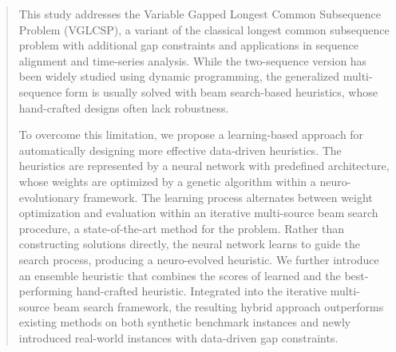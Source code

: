 \documentclass[runningheads]{llncs}
\begin{document}
\begin{abstract}
	

This study addresses the Variable Gapped Longest Common Subsequence Problem (VGLCSP), a variant of the classical longest common subsequence problem with additional gap constraints and applications in sequence alignment and time-series analysis. While the two-sequence version has been widely studied using dynamic programming, the generalized multi-sequence form is usually solved with beam search-based heuristics, whose hand-crafted designs often lack robustness.

To overcome this limitation, we propose a learning-based approach for automatically designing more effective data-driven heuristics. The heuristics are represented by a neural network with predefined architecture, whose weights are optimized by a genetic algorithm within a neuro-evolutionary framework. The learning process alternates between weight optimization and evaluation within an iterative multi-source beam search procedure, a state-of-the-art method for the problem. Rather than constructing solutions directly, the neural network learns to guide the search process, producing a neuro-evolved heuristic. We further introduce an ensemble heuristic that combines the scores of learned and the best-performing hand-crafted heuristic. Integrated into the iterative multi-source beam search framework, the resulting hybrid approach outperforms existing methods on both synthetic benchmark instances and newly introduced real-world instances with data-driven gap constraints.
\end{abstract}
\end{document}
